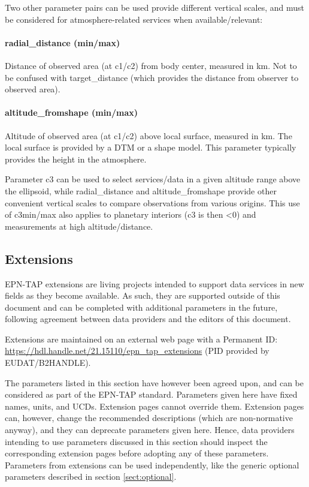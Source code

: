 \documentclass[11pt,a4paper]{ivoa}
\begin{document}
Two other parameter pairs can be used provide different vertical
scales, and must be considered for atmosphere-related services when
available/relevant:

\paragraph{radial\_distance (min/max)}

Distance of observed area (at c1/c2) from body center, measured in km.
Not to be confused with target\_distance
(which provides the distance from observer to observed area).

\paragraph{altitude\_fromshape (min/max)}

Altitude of observed area (at c1/c2) above local surface, measured in km.
The local surface is provided by a DTM or a shape model.
This parameter typically provides the height in the atmosphere.

Parameter c3 can be used to select services/data in a given altitude
range above the ellipsoid, while radial\_distance and altitude\_fromshape
provide other convenient vertical scales to compare observations from
various origins. This use of c3min/max also applies to planetary interiors
(c3 is then <0) and measurements at high altitude/distance.

\subsection{Extensions}
\label{sect:extensions}

EPN-TAP extensions are living projects intended to support data services in new fields as they become available. As such, they are supported outside of this document and can be completed with additional parameters in the future, following agreement between data providers and the editors of this document.

Extensions are maintained on an external web page with a Permanent ID:
\url{https://hdl.handle.net/21.15110/epn_tap_extensions} (PID provided by EUDAT/B2HANDLE).

The parameters listed in this section have however been agreed upon, and
can be considered as part of the EPN-TAP standard. Parameters given here have
fixed names, units, and UCDs.  Extension pages cannot override
them.  Extension pages can, however, change the recommended
descriptions (which are non-normative anyway), and they can
deprecate parameters given here.  Hence, data providers intending
to use parameters discussed in this section should inspect the
corresponding extension pages before adopting any of these
parameters.
Parameters from extensions can be used independently, like the generic optional parameters
described in section \ref{sect:optional}.
\end{document}

